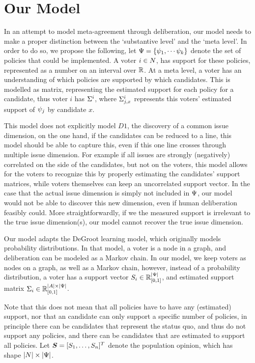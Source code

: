 \section{Our Model} \label{sec: main model}

In an attempt to model meta-agreement through deliberation, our model needs to
make a proper distinction between the `substantive level' and the `meta level'.
In order to do so, we propose the following, let \(\Psi = \{\psi_{1},
\cdots \psi_{k}\}\) denote the set of policies that could be implemented. A
voter $i \in N$, has support for these policies, represented as a number
on an interval over $\mathbb{R}$. At a meta level, a voter has an understanding of
which policies are supported by which candidates. This is modelled as matrix,
representing the estimated support for each policy for a candidate, thus voter
$i$ has $\Sigma^i$, where $\Sigma^i_{j, x}$ represents this voters'
estimated support of $\psi_j$ by candidate $x$.

This model does not explicitly model $D1$, the discovery of a common issue
dimension, on the one hand, if the candidates can be reduced to a line, this
model should be able to capture this, even if this one line crosses through
multiple issue dimension. For example if all issues are strongly (negatively)
correlated on the side of the candidates, but not on the voters, this model
allows for the voters to recognize this by properly estimating the
candidates' support matrices, while voters themselves can keep an
uncorrelated support vector. In the case that the actual issue dimension is
simply not included in $\Psi$, our model would not be able to discover
this new dimension, even if human deliberation feasibly could. More
straightforwardly, if we the measured support is irrelevant to the true issue
dimension(s), our model cannot recover the true issue dimension.

Our model adapts the DeGroot learning model, which
originally models probability distributions. In that model, a voter is
a node in a graph, and deliberation can be modeled as a Markov chain. In our
model, we keep voters as nodes on a graph, as well as a Markov chain, however,
instead of a probability distribution, a voter has a support vector $S_i \in
	\mathbb{R}^{|\Psi|}_{[0,1]}$, and estimated support matrix $\Sigma_i\in
	\mathbb{R}^{|A| \times |\Psi|}_{[0,1]}$.

Note that this does not mean that all policies have to have any (estimated)
support, nor that an candidate can only support a specific number of
policies, in principle there can be candidates that represent the status quo,
and thus do not support any policies, and there can be candidates that are
estimated to support all policies.  Let $\boldsymbol{S}= [S_1, \dots,
	S_{n}]^{T}$ denote the population opinion, which has shape \(|N|
\times |\Psi|\).

